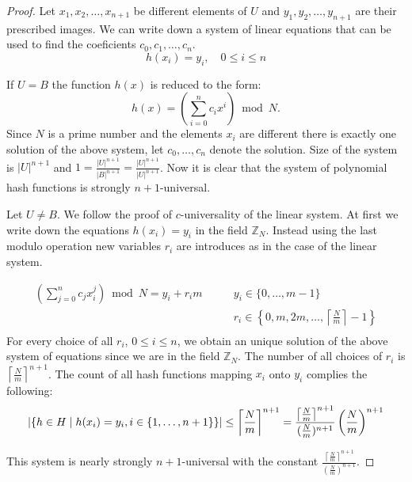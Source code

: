 \begin{proof}
Let $x_1, x_2, \dots, x_{n+1}$ be different elements of $U$ and $y_1, y_2, \dots, y_{n+1}$ are their prescribed images. We can write down a system of linear equations that can be used to find the coeficients $c_0, c_1, \dots, c_n$.
\[ 
h(x_i) = y_i, \quad 0 \leq i \leq n 
\]

If $U = B$ the function $h(x)$ is reduced to the form: \[ h(x) = \left( \displaystyle \sum_{i=0}^{n} c_i x^i \right) \bmod N \textit{.} \] Since $N$ is a prime number and the elements $x_i$ are different there is exactly one solution of the above system, let $c_0, \dots, c_n$ denote the solution. Size of the system is ${|U|}^{n+1}$ and $1 = \frac{|U| ^ {n + 1}}{|B|^{n + 1}} = \frac{|U| ^ {n + 1}}{|U|^{n + 1}}$. Now it is clear that the system of polynomial hash functions is strongly $n + 1$-universal.

Let $U \neq B$. We follow the proof of $c$-universality of the linear system. At first we write down the equations $h(x_i) = y_i$ in the field $\mathbb{Z}_N$. Instead using the last modulo operation new variables $r_i$ are introduces as in the case of the linear system.

\begin{displaymath}
\begin{split}
\left(\displaystyle \sum_{j=0}^{n} c_j x_{i}^{j} \right) \bmod N = {y}_i + {r_i}{m} \qquad 
 & y_i \in \{0, \dots, m - 1 \} \\
 & r_i \in \left\{0, m, 2m, \dots, \left\lceil \frac{N}{m} \right\rceil - 1 \right\} \\
\end{split}
\end{displaymath}
For every choice of all $r_i$, $0 \leq i \leq n$, we obtain an unique solution of the above system of equations since we are in the field $\mathbb{Z}_N$. The number of all choices of $r_i$ is ${\left\lceil \frac{N}{m} \right\rceil}^{n + 1}$. The count of all hash functions mapping $x_i$ onto $y_i$ complies the following:
\begin{displaymath}
|\{h \in H \mid h(x_i) = y_i, i \in \{1, \dots, n + 1\}\}| \leq {\left\lceil \frac{N}{m} \right\rceil}^{n + 1} = \frac{{\left\lceil \frac{N}{m} \right\rceil}^{n + 1}}{(\frac{N}{m})^{n+1}}\left(\frac{N}{m}\right)^{n+1}
\end{displaymath}

This system is nearly strongly $n+1$-universal with the constant $\frac{{\left\lceil \frac{N}{m} \right\rceil}^{n + 1}}{(\frac{N}{m})^{n+1}}$.
\end{proof}

